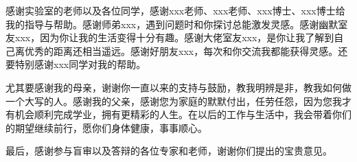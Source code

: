 感谢实验室的老师以及各位同学，感谢xxx老师、xxx老师、xxx博士、xxx博士给我的指导与帮助。感谢师弟xxx，遇到问题时和你探讨总能激发灵感。感谢幽默室友xxx，因为你让我的生活变得十分有趣。感谢大佬室友xxx，是你让我了解到自己离优秀的距离还相当遥远。感谢好朋友xxx，每次和你交流我都能获得灵感。还要特别感谢xxx同学对我的帮助。

尤其要感谢我的母亲，谢谢你一直以来的支持与鼓励，教我明辨是非，教我如何做一个大写的人。感谢我的父亲，感谢您为家庭的默默付出，任劳任怨，因为您我才有机会顺利完成学业，拥有更精彩的人生。在以后的工作与生活中，我会带着你们的期望继续前行，愿你们身体健康，事事顺心。

最后，感谢参与盲审以及答辩的各位专家和老师，谢谢你们提出的宝贵意见。












